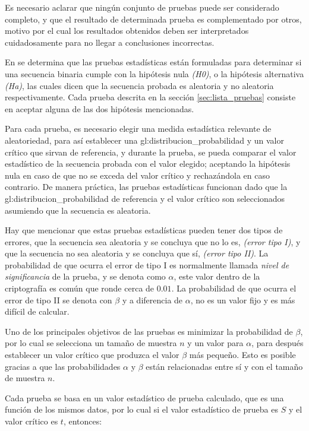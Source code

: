Es necesario aclarar que ningún conjunto de pruebas puede ser considerado
completo, y que el resultado de determinada prueba es complementado por
otros, motivo por el cual los resultados obtenidos deben ser interpretados
cuidadosamente para no llegar a conclusiones incorrectas.

En \cite{nist_pruebas} se determina que las pruebas estadísticas están
formuladas para determinar si una secuencia binaria cumple con la hipótesis
nula \textit{(H0)}, o la hipótesis alternativa \textit{(Ha)}, las cuales dicen
que la secuencia probada es aleatoria y no aleatoria respectivamente. Cada
prueba descrita en la sección \ref{sec:lista_pruebas} consiste en aceptar
alguna de las dos hipótesis mencionadas.

Para cada prueba, es necesario elegir una medida estadística relevante de
aleatoriedad, para así establecer una \gls{gl:distribucion_probabilidad} y un
valor crítico que sirvan de referencia, y durante la prueba, se pueda
comparar el valor estadístico de la secuencia probada con el valor elegido;
aceptando la hipótesis nula en caso de que no se exceda del valor crítico y
rechazándola en caso contrario. De manera práctica, las pruebas estadísticas
funcionan dado que la \gls{gl:distribucion_probabilidad} de referencia y el
valor crítico son seleccionados asumiendo que la secuencia es aleatoria.

Hay que mencionar que estas pruebas estadísticas pueden tener dos tipos de
errores, que la secuencia sea aleatoria y se concluya que no lo es,
\textit{(error tipo I)}, y que la secuencia no sea aleatoria y se concluya
que sí, \textit{(error tipo II)}. La probabilidad de que ocurra el error de
tipo I es normalmente llamada \textit{nivel de significancia} de la prueba, y se
denota como $\alpha$, este valor dentro de la criptografía es común que ronde
cerca de $0.01$. La probabilidad de que ocurra el error de tipo II se denota
con $\beta$ y a diferencia de $\alpha$, no es un valor fijo y es más difícil
de calcular.

Uno de los principales objetivos de las pruebas es minimizar la probabilidad
de $\beta$, por lo cual se selecciona un tamaño de muestra $n$ y un valor para
$\alpha$, para después establecer un valor crítico que produzca el valor
$\beta$ más pequeño. Esto es posible gracias a que las probabilidades $\alpha$
y $\beta$ están relacionadas entre sí y con el tamaño de muestra $n$.

Cada prueba se basa en un valor estadístico de prueba calculado, que es una
función de los mismos datos, por lo cual si el valor estadístico de prueba
es $S$ y el valor crítico es $t$, entonces:

